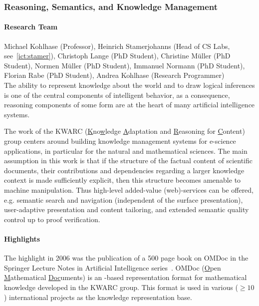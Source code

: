 \newpage
\subsubsection{Reasoning, Semantics, and Knowledge  Management}
\label{ict:modeling:kohlhase} 

\paragraph{Research Team}
Michael Kohlhase (Professor),
Heinrich Stamerjohanns (Head of CS Labs, see~\ref{ict:stamer}),
Christoph Lange (PhD Student),
Christine M\"uller (PhD Student),
Normen M\"uller (PhD Student),
Immanuel Normann (PhD Student),
Florian Rabe (PhD Student),
Andrea Kohlhase (Research Programmer) \\


The ability to represent knowledge about the world and to draw logical inferences is one
of the central components of intelligent behavior, as a consequence, reasoning components
of some form are at the heart of many artificial intelligence systems.

The work of the KWARC (\underline{K}no\underline{w}ledge \underline{A}daptation and
\underline{R}easoning for \underline{C}ontent) group centers around building knowledge
management systems for e-science applications, in particular for the natural and
mathematical sciences.  The main assumption in this work is that if the structure of the
factual content of scientific documents, their contributions and dependencies regarding a
larger knowledge context is made sufficiently explicit, then this structure becomes
amenable to machine manipulation. Thus high-level added-value (web)-services can be offered,
e.g. semantic search and navigation (independent of the surface presentation),
user-adaptive presentation and content tailoring, and extended semantic quality control up
to proof verification.

\paragraph{Highlights}

The highlight in 2006 was the publication of a 500 page book on OMDoc in the Springer
Lecture Notes in Artificial Intelligence series~\cite{Kohlhase:omdoc1.2}. OMDoc
({\underline{O}}pen {\underline{M}}athematical {\underline{Doc}}uments) is an
{}-based representation format for mathematical knowledge developed in the KWARC
group. This format is used in various ($\geq 10$) international projects as the knowledge
representation base.

